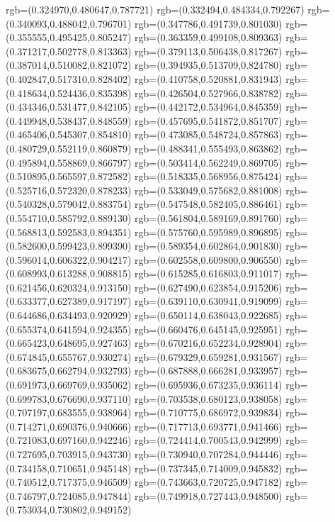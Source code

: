 {{{			rgb=(0.324970,0.480647,0.787721)
			rgb=(0.332494,0.484334,0.792267)
			rgb=(0.340093,0.488042,0.796701)
			rgb=(0.347786,0.491739,0.801030)
			rgb=(0.355555,0.495425,0.805247)
			rgb=(0.363359,0.499108,0.809363)
			rgb=(0.371217,0.502778,0.813363)
			rgb=(0.379113,0.506438,0.817267)
			rgb=(0.387014,0.510082,0.821072)
			rgb=(0.394935,0.513709,0.824780)
			rgb=(0.402847,0.517310,0.828402)
			rgb=(0.410758,0.520881,0.831943)
			rgb=(0.418634,0.524436,0.835398)
			rgb=(0.426504,0.527966,0.838782)
			rgb=(0.434346,0.531477,0.842105)
			rgb=(0.442172,0.534964,0.845359)
			rgb=(0.449948,0.538437,0.848559)
			rgb=(0.457695,0.541872,0.851707)
			rgb=(0.465406,0.545307,0.854810)
			rgb=(0.473085,0.548724,0.857863)
			rgb=(0.480729,0.552119,0.860879)
			rgb=(0.488341,0.555493,0.863862)
			rgb=(0.495894,0.558869,0.866797)
			rgb=(0.503414,0.562249,0.869705)
			rgb=(0.510895,0.565597,0.872582)
			rgb=(0.518335,0.568956,0.875424)
			rgb=(0.525716,0.572320,0.878233)
			rgb=(0.533049,0.575682,0.881008)
			rgb=(0.540328,0.579042,0.883754)
			rgb=(0.547548,0.582405,0.886461)
			rgb=(0.554710,0.585792,0.889130)
			rgb=(0.561804,0.589169,0.891760)
			rgb=(0.568813,0.592583,0.894351)
			rgb=(0.575760,0.595989,0.896895)
			rgb=(0.582600,0.599423,0.899390)
			rgb=(0.589354,0.602864,0.901830)
			rgb=(0.596014,0.606322,0.904217)
			rgb=(0.602558,0.609800,0.906550)
			rgb=(0.608993,0.613288,0.908815)
			rgb=(0.615285,0.616803,0.911017)
			rgb=(0.621456,0.620324,0.913150)
			rgb=(0.627490,0.623854,0.915206)
			rgb=(0.633377,0.627389,0.917197)
			rgb=(0.639110,0.630941,0.919099)
			rgb=(0.644686,0.634493,0.920929)
			rgb=(0.650114,0.638043,0.922685)
			rgb=(0.655374,0.641594,0.924355)
			rgb=(0.660476,0.645145,0.925951)
			rgb=(0.665423,0.648695,0.927463)
			rgb=(0.670216,0.652234,0.928904)
			rgb=(0.674845,0.655767,0.930274)
			rgb=(0.679329,0.659281,0.931567)
			rgb=(0.683675,0.662794,0.932793)
			rgb=(0.687888,0.666281,0.933957)
			rgb=(0.691973,0.669769,0.935062)
			rgb=(0.695936,0.673235,0.936114)
			rgb=(0.699783,0.676690,0.937110)
			rgb=(0.703538,0.680123,0.938058)
			rgb=(0.707197,0.683555,0.938964)
			rgb=(0.710775,0.686972,0.939834)
			rgb=(0.714271,0.690376,0.940666)
			rgb=(0.717713,0.693771,0.941466)
			rgb=(0.721083,0.697160,0.942246)
			rgb=(0.724414,0.700543,0.942999)
			rgb=(0.727695,0.703915,0.943730)
			rgb=(0.730940,0.707284,0.944446)
			rgb=(0.734158,0.710651,0.945148)
			rgb=(0.737345,0.714009,0.945832)
			rgb=(0.740512,0.717375,0.946509)
			rgb=(0.743663,0.720725,0.947182)
			rgb=(0.746797,0.724085,0.947844)
			rgb=(0.749918,0.727443,0.948500)
			rgb=(0.753034,0.730802,0.949152)
}}}
